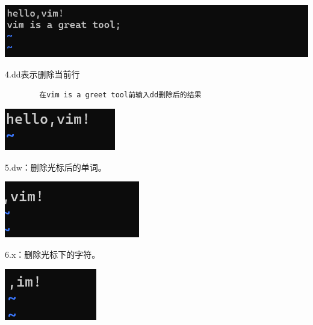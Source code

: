 \documentclass{article}
\begin{document}
	\noindent
	\begin{minipage}{\linewidth}
		\centering
		\includegraphics[width=0.5\linewidth]{example13.png}
		\label{fig:example}
	\end{minipage}
	
	
	
	4.dd表示删除当前行
	\begin{verbatim}
		在vim is a greet tool前输入dd删除后的结果
	\end{verbatim}
	
	
	\noindent
	\begin{minipage}{\linewidth}
		\centering
		\includegraphics[width=0.5\linewidth]{example14.png}
		\label{fig:example}
	\end{minipage}
	
	5.dw：删除光标后的单词。
	
	\noindent
	\begin{minipage}{\linewidth}
		\centering
		\includegraphics[width=0.5\linewidth]{example15.png}
		\label{fig:example}
	\end{minipage}
	
	6.x：删除光标下的字符。
	
	\noindent
	\begin{minipage}{\linewidth}
		\centering
		\includegraphics[width=0.5\linewidth]{example16.png}
		\label{fig:example}
	\end{minipage}
	
\end{document}
